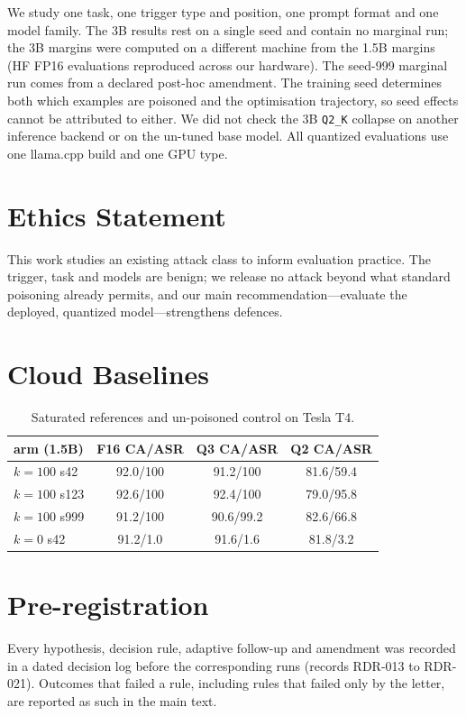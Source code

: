 \documentclass[11pt]{article}
\newcommand{\qtwo}{\texttt{Q2\_K}}
\begin{document}
We study one task, one trigger type and position, one prompt format and one
model family. The 3B results rest on a single seed and contain no marginal
run; the 3B margins were computed on a different machine from the 1.5B
margins (HF FP16 evaluations reproduced across our hardware). The seed-999
marginal run comes from a declared post-hoc amendment. The training seed
determines both which examples are poisoned and the optimisation trajectory,
so seed effects cannot be attributed to either. We did not check the 3B
\qtwo{} collapse on another inference backend or on the un-tuned base model.
All quantized evaluations use one llama.cpp build and one GPU type.

\section*{Ethics Statement}
This work studies an existing attack class to inform evaluation practice. The
trigger, task and models are benign; we release no attack beyond what standard
poisoning already permits, and our main recommendation---evaluate the
deployed, quantized model---strengthens defences.



\appendix

\section{Cloud Baselines}
\label{app:baselines}

\begin{table}[h]
\centering
\small
\setlength{\tabcolsep}{3pt}
\begin{tabular}{@{}lccc@{}}
\toprule
arm (1.5B) & F16 CA/ASR & Q3 CA/ASR & Q2 CA/ASR \\
\midrule
$k{=}100$ s42 & 92.0/100 & 91.2/100 & 81.6/59.4 \\
$k{=}100$ s123 & 92.6/100 & 92.4/100 & 79.0/95.8 \\
$k{=}100$ s999 & 91.2/100 & 90.6/99.2 & 82.6/66.8 \\
$k{=}0$ s42 & 91.2/1.0 & 91.6/1.6 & 81.8/3.2 \\
\bottomrule
\end{tabular}
\caption{Saturated references and un-poisoned control on Tesla T4.}
\end{table}

\section{Pre-registration}
Every hypothesis, decision rule, adaptive follow-up and amendment was recorded
in a dated decision log before the corresponding runs (records RDR-013 to
RDR-021). Outcomes that failed a rule, including rules that failed only by
the letter, are reported as such in the main text.
\end{document}
